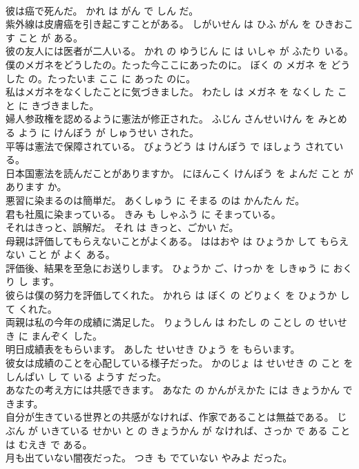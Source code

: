 \documentclass[8pt]{extreport}
\begin{document}
\begin{CJK}{UTF8}{min}
\\	彼は癌で死んだ。	かれ は がん で しん だ。	
\\	紫外線は皮膚癌を引き起こすことがある。	しがいせん は ひふ がん を ひきおこす こと が ある。	
\\	彼の友人には医者が二人いる。	かれ の ゆうじん に は いしゃ が ふたり いる。	
\\	僕のメガネをどうしたの。たった今ここにあったのに。	ぼく の メガネ を どう した の。たったいま ここ に あった のに。	
\\	私はメガネをなくしたことに気づきました。	わたし は メガネ を なくし た こと に きづきました。	
\\	婦人参政権を認めるように憲法が修正された。	ふじん さんせいけん を みとめる よう に けんぽう が しゅうせい された。	
\\	平等は憲法で保障されている。	びょうどう は けんぽう で ほしょう されている。	
\\	日本国憲法を読んだことがありますか。	にほんこく けんぽう を よんだ こと が あります か。	
\\	悪習に染まるのは簡単だ。	あくしゅう に そまる のは かんたん だ。	
\\	君も社風に染まっている。	きみ も しゃふう に そまっている。	
\\	それはきっと、誤解だ。	それ は きっと、ごかい だ。	
\\	母親は評価してもらえないことがよくある。	ははおや は ひょうか して もらえ ない こと が よく ある。	
\\	評価後、結果を至急にお送りします。	ひょうか ご、けっか を しきゅう に おくり し ます。	
\\	彼らは僕の努力を評価してくれた。	かれら は ぼく の どりょく を ひょうか して くれた。	
\\	両親は私の今年の成績に満足した。	りょうしん は わたし の ことし の せいせき に まんぞく した。	
\\	明日成績表をもらいます。	あした せいせき ひょう を もらいます。	
\\	彼女は成績のことを心配している様子だった。	かのじょ は せいせき の こと を しんぱい し て いる ようす だった。	
\\	あなたの考え方には共感できます。	あなた の かんがえかた には きょうかん できます。	
\\	自分が生きている世界との共感がなければ、作家であることは無益である。	じぶん が いきている せかい と の きょうかん が なければ、さっか で ある こと は むえき で ある。	
\\	月も出ていない闇夜だった。	つき も でていない やみよ だった。	

\end{CJK}
\end{document}
